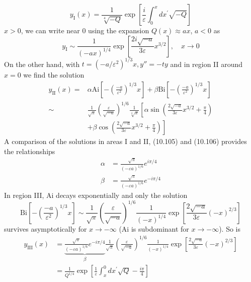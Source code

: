 \begin{equation}
    y_{\mathrm{I}}(x)=\frac{1}{\sqrt[4]{-Q}} \exp \left[\frac{i}{\varepsilon} \int_{0}^{x} d x^{\prime} \sqrt{-Q}\right]
    \end{equation}
$x> 0$, we can write near 0 using the expansion $Q (x) \approx ax$, $a <0$ as
\begin{equation}
    y_{\mathrm{I}} \sim \frac{1}{(-a x)^{1 / 4}} \exp \left[\frac{2 i \sqrt{-a}}{3 \varepsilon} x^{3 / 2}\right], \quad x \rightarrow 0
    \end{equation}
On the other hand, with $t = (−a / \varepsilon^2)^{1 / 3}x, y'' = −ty$ and in region II around $x = 0$ we find the solution
\begin{equation}
\begin{aligned} y_{\mathrm{II}}(x)=& \alpha \mathrm{Ai}\left[-\left(\frac{-a}{\varepsilon^{2}}\right)^{1 / 3} x\right]+\beta \mathrm{Bi}\left[-\left(\frac{-a}{\varepsilon^{2}}\right)^{1 / 3} x\right] \\ \sim & \frac{1}{\sqrt{\pi}}\left(\frac{\varepsilon}{\sqrt{-a}}\right)^{1 / 6} \frac{1}{\sqrt[4]{x}}\left[\alpha \sin \left(\frac{2 \sqrt{-a}}{3 \varepsilon} x^{3 / 2}+\frac{\pi}{4}\right)\right.\\ &\left.+\beta \cos \left(\frac{2 \sqrt{-a}}{3 \varepsilon} x^{3 / 2}+\frac{\pi}{4}\right)\right] \end{aligned}
\end{equation}
A comparison of the solutions in areas I and II, (10.105) and (10.106) provides the relationships
\begin{equation}
\begin{aligned} \alpha &=\frac{\sqrt{\pi}}{(-\varepsilon a)^{1 / 6}} e^{i \pi / 4} \\ \beta &=\frac{\sqrt{\pi}}{(-\varepsilon a)^{1 / 6}} e^{-i \pi / 4} \end{aligned}
\end{equation}
In region III, Ai decays exponentially and only the solution
$$
    \mathrm{Bi}\left[-\left(\frac{-a}{\varepsilon^{2}}\right)^{1 / 3} x\right] \sim \frac{1}{\sqrt{\pi}}\left(\frac{\varepsilon}{\sqrt{-a}}\right)^{1 / 6} \frac{1}{(-x)^{1 / 4}} \exp \left[\frac{2 \sqrt{-a}}{3 \varepsilon}(-x)^{2 / 3}\right]
$$
survives asymptotically for $x\rightarrow-\infty$ (Ai is subdominant for $x\rightarrow-\infty$). So is
\begin{equation}
\begin{aligned} y_{\mathrm{III}}(x) &=\underbrace{\frac{\sqrt{\pi}}{(-\varepsilon a)^{1 / 6}} e^{-i \pi / 4}}_{\beta} \frac{1}{\sqrt{\pi}}\left(\frac{\varepsilon}{\sqrt{-a}}\right)^{1 / 6} \frac{1}{(-x)^{1 / 4}} \exp \left[\frac{2 \sqrt{-a}}{3 \varepsilon}(-x)^{2 / 3}\right] \\ &=\frac{1}{Q^{1 / 4}} \exp \left[\frac{1}{\varepsilon} \int_{x}^{0} d x^{\prime} \sqrt{Q}-\frac{i \pi}{4}\right] \end{aligned}
\end{equation}
